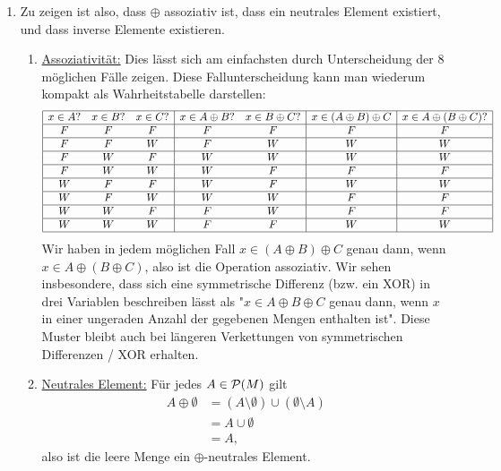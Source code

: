 \documentclass{article}
\begin{document}
\begin{enumerate}
	\item {}
	
	Zu zeigen ist also, dass $\oplus$ assoziativ ist, dass ein neutrales Element existiert, und dass inverse Elemente existieren.
	\begin{enumerate}
		\item \ul{Assoziativität:} Dies lässt sich am einfachsten durch Unterscheidung der $8$ möglichen Fälle zeigen. Diese Fallunterscheidung kann man wiederum kompakt als Wahrheitstabelle darstellen:
		\begin{align*}
			\begin{array}{|ccc|cc|c|c|}
				\hline
				x \in A? & x \in B? & x \in C? & x \in A \oplus B? & x \in B \oplus C? & x \in (A \oplus B) \oplus C & x \in A \oplus (B \oplus C)?\\
				\hline
				F & F & F & F & F & F & F\\
				\hline
				F & F & W & F & W & W & W\\
				\hline
				F & W & F & W & W & W & W\\
				\hline
				F & W & W & W & F & F & F\\
				\hline
				W & F & F & W & F & W & W\\
				\hline
				W & F & W & W & W & F & F\\
				\hline
				W & W & F & F & W & F & F\\
				\hline
				W & W & W & F & F & W & W\\
				\hline
			\end{array}
		\end{align*}
		Wir haben in jedem möglichen Fall $x \in (A \oplus B) \oplus C$ genau dann, wenn $x \in A \oplus (B \oplus C)$, also ist die Operation assoziativ. Wir sehen insbesondere, dass sich eine symmetrische Differenz (bzw. ein XOR) in drei Variablen beschreiben lässt als "$x \in A \oplus B \oplus C$ genau dann, wenn $x$ in einer ungeraden Anzahl der gegebenen Mengen enthalten ist". Diese Muster bleibt auch bei längeren Verkettungen von symmetrischen Differenzen / XOR erhalten.
		\item \ul{Neutrales Element:} Für jedes $A \in \mathcal{P}(M)$ gilt
		\begin{align*}
			A \oplus \emptyset 
			&= (A \setminus \emptyset) \cup (\emptyset \setminus A)\\
			&= A \cup \emptyset\\
			&= A,
		\end{align*}
		also ist die leere Menge ein $\oplus$-neutrales Element.

\end{enumerate}
\end{enumerate}
\end{document}
